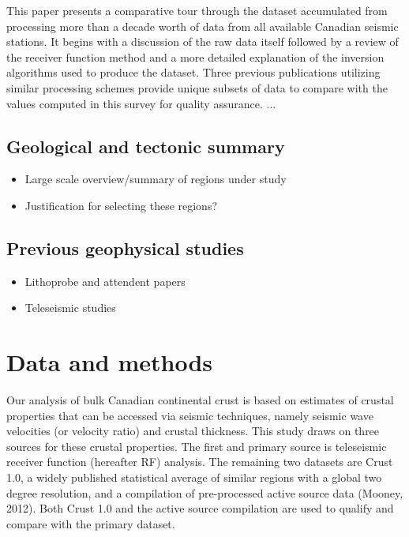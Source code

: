 \documentclass[draft, 12pt]{article}
\begin{document}
This paper presents a comparative tour through the dataset accumulated from processing more than a decade worth of data from all available Canadian seismic stations. It begins with a discussion of the raw data itself followed by a review of the receiver function method and a more detailed explanation of the inversion algorithms used to produce the dataset. Three previous publications utilizing similar processing schemes provide unique subsets of data to compare with the values computed in this survey for quality assurance. ...




\subsection{Geological and tectonic summary}
\begin{itemize}

\item Large scale overview/summary of regions under study
\item Justification for selecting these regions?

\end{itemize}

\subsection{Previous geophysical studies}
 \begin{itemize}

\item Lithoprobe and attendent papers
\item Teleseismic studies

\end{itemize}





\section{Data and methods}
Our analysis of bulk Canadian continental crust is based on estimates of crustal properties that can be accessed via seismic techniques, namely seismic wave velocities (or velocity ratio) and crustal thickness. This study draws on three sources for these crustal properties. The first and primary source is teleseismic receiver function (hereafter RF) analysis. The remaining two datasets are Crust 1.0, a widely published statistical average of similar regions with a global two degree resolution, and a compilation of pre-processed active source data (Mooney, 2012). Both Crust 1.0 and the active source compilation are used to qualify and compare with the primary dataset.
\end{document}
